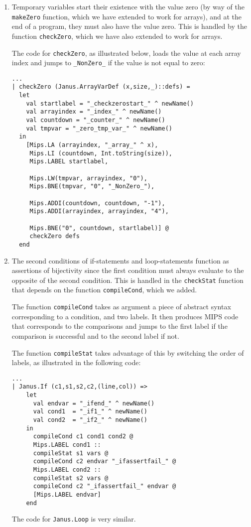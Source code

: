 \begin{enumerate}
  \item Temporary variables start their existence with the value zero (by way of
        the \verb+makeZero+ function, which we have extended to work for
        arrays), and at the end of a program, they must also have the value
        zero.  This is handled by the function \verb+checkZero+, which we have
        also extended to work for arrays.

        The code for \verb+checkZero+, as illustrated below, loads the value at
        each array index and jumps to \verb+_NonZero_+ if the value is not equal
        to zero:
\begin{verbatim}
...
| checkZero (Janus.ArrayVarDef (x,size,_)::defs) =
  let
    val startlabel = "_checkzerostart_" ^ newName()
    val arrayindex = "_index_" ^ newName()
    val countdown = "_counter_" ^ newName()
    val tmpvar = "_zero_tmp_var_" ^ newName()
  in
    [Mips.LA (arrayindex, "_array_" ^ x),
     Mips.LI (countdown, Int.toString(size)),
     Mips.LABEL startlabel,

     Mips.LW(tmpvar, arrayindex, "0"),
     Mips.BNE(tmpvar, "0", "_NonZero_"),

     Mips.ADDI(countdown, countdown, "-1"),
     Mips.ADDI(arrayindex, arrayindex, "4"),

     Mips.BNE("0", countdown, startlabel)] @
     checkZero defs
  end
\end{verbatim}

  \item The second conditions of if-statements and loop-statements function as
        assertions of bijectivity since the first condition must always evaluate
        to the opposite of the second condition. This is handled in the
        \verb+checkStat+ function that depends on the function \verb+compileCond+,
        which we added.

        The function \verb+compileCond+ takes as argument a piece of abstract
        syntax corresponding to a condition, and two labels. It then produces
        MIPS code that corresponds to the comparisons and jumps to the first
        label if the comparison is successful and to the second label if not.

        The function \verb+compileStat+ takes advantage of this by switching the
        order of labels, as illustrated in the following code:

\begin{verbatim}
...
| Janus.If (c1,s1,s2,c2,(line,col)) =>
    let
      val endvar = "_ifend_" ^ newName()
      val cond1  = "_if1_" ^ newName()
      val cond2  = "_if2_" ^ newName()
    in
      compileCond c1 cond1 cond2 @
      Mips.LABEL cond1 ::
      compileStat s1 vars @
      compileCond c2 endvar "_ifassertfail_" @
      Mips.LABEL cond2 ::
      compileStat s2 vars @
      compileCond c2 "_ifassertfail_" endvar @
      [Mips.LABEL endvar]
    end
\end{verbatim}

The code for \verb+Janus.Loop+ is very similar.

\end{enumerate}


